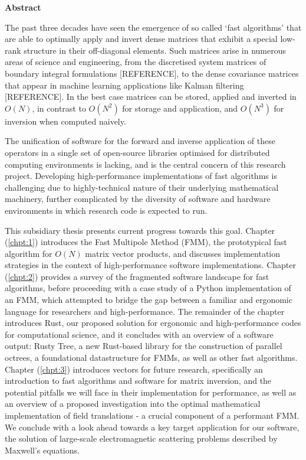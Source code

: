 \thispagestyle{plain}

\begin{center}
    \textbf{Abstract}
\end{center}

The past three decades have seen the emergence of so called `fast algorithms' that are able to optimally apply and invert dense matrices that exhibit a special low-rank structure in their off-diagonal elements. Such matrices arise in numerous areas of science and engineering, from the discretised system matrices of boundary integral formulations [REFERENCE], to the dense covariance matrices that appear in machine learning applications like Kalman filtering [REFERENCE]. In the best case matrices can be stored, applied and inverted in $O(N)$, in contrast to $O(N^2)$ for storage and application, and $O(N^3)$ for inversion when computed naively.

The unification of software for the forward and inverse application of these operators in a single set of open-source libraries optimised for distributed computing environments is lacking, and is the central concern of this research project. Developing high-performance implementations of fast algorithms is challenging due to highly-technical nature of their underlying mathematical machinery, further complicated by the diversity of software and hardware environments in which research code is expected to run.

This subsidiary thesis presents current progress towards this goal. Chapter (\ref{chpt:1}) introduces the Fast Multipole Method (\gls{FMM}), the prototypical fast algorithm for $O(N)$ matrix vector products, and discusses implementation strategies in the context of high-performance software implementations. Chapter (\ref{chpt:2}) provides a survey of the fragmented software landscape for fast algorithms, before proceeding with a case study of a Python implementation of an FMM, which attempted to bridge the gap between a familiar and ergonomic language for researchers and high-performance. The remainder of the chapter introduces Rust, our proposed solution for ergonomic and high-performance codes for computational science, and it concludes with an overview of a software output: Rusty Tree, a new Rust-based library for the construction of parallel octrees, a foundational datastructure for \gls{FMM}s, as well as other fast algorithms. Chapter (\ref{chpt:3}) introduces vectors for future research, specifically an introduction to fast algorithms and software for matrix inversion, and the potential pitfalls we will face in their implementation for performance, as well as an overview of a proposed investigation into the optimal mathematical implementation of field translations - a crucial component of a performant FMM. We conclude with a look ahead towards a key target application for our software, the solution of large-scale electromagnetic scattering problems described by Maxwell's equations.
